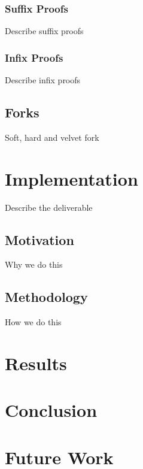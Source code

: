 \documentclass{article}
\begin{document}
\subsubsection{Suffix Proofs}
Describe suffix proofs
\subsubsection{Infix Proofs}
Describe infix proofs
\subsection{Forks}
Soft, hard and velvet fork

\section{Implementation}
Describe the deliverable
\subsection{Motivation}
Why we do this
\subsection{Methodology}
How we do this

\section{Results}
\section{Conclusion}
\section{Future Work}
\end{document}
